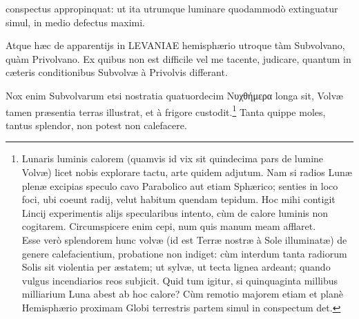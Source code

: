 \documentclass[a4paper, 11pt, oneside, polutonikogreek, german]{article}
\begin{document}
conspectus appropinquat: ut ita utrumque luminare quodammodò extinguatur simul, in medio defectus maximi.

Atque hæc de apparentijs in LEVANIAE hemisphærio utroque tàm Subvolvano, quàm Privolvano. Ex quibus non est difficile vel me tacente, judicare, quantum in cæteris conditionibus Subvolvæ à Privolvis differant.

Nox enim Subvolvarum etsi nostratia quatuordecim Νυχθήμερα longa sit, Volvæ tamen præsentia terras illustrat, et à frigore custodit.\footnote{Lunaris luminis calorem (quamvis id vix sit quindecima pars de lumine Volvæ) licet nobis explorare tactu, arte quidem adjutum. Nam si radios Lunæ plenæ excipias speculo cavo Parabolico aut etiam Sphærico; senties in loco foci, ubi coeunt radij, velut habitum quendam tepidum. Hoc mihi contigit Lincij experimentis alijs specularibus intento, cùm de calore luminis non cogitarem. Circumspicere enim cepi, num quis manum meam afflaret.\\\hspace*{5mm}Esse verò splendorem hunc volvæ (id est Terræ nostræ à Sole illuminatæ) de genere calefacientium, probatione non indiget: cùm interdum tanta radiorum Solis sit violentia per æstatem; ut sylvæ, ut tecta lignea ardeant; quando vulgus incendiarios reos subjicit. Quid tum igitur, si quinquaginta millibus milliarium Luna abest ab hoc calore? Cùm remotio majorem etiam et planè Hemisphærio proximam Globi terrestris partem simul in conspectum det.} Tanta quippe moles, tantus splendor, non potest non calefacere.
\end{document}
